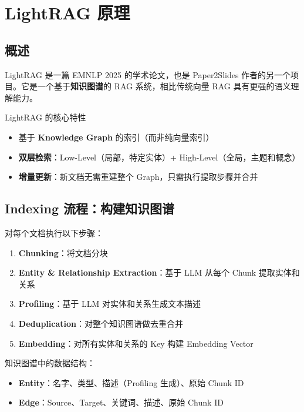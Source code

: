 \section{LightRAG 原理}

\subsection{概述}

LightRAG 是一篇 EMNLP 2025 的学术论文，也是 Paper2Slides 作者的另一个项目。它是一个基于\textbf{知识图谱}的 RAG 系统，相比传统向量 RAG 具有更强的语义理解能力。

\begin{importantbox}{LightRAG 的核心特性}
\begin{itemize}
    \item 基于 \textbf{Knowledge Graph} 的索引（而非纯向量索引）
    \item \textbf{双层检索}：Low-Level（局部，特定实体）+ High-Level（全局，主题和概念）
    \item \textbf{增量更新}：新文档无需重建整个 Graph，只需执行提取步骤并合并
\end{itemize}
\end{importantbox}

\subsection{Indexing 流程：构建知识图谱}

对每个文档执行以下步骤：

\begin{enumerate}
    \item \textbf{Chunking}：将文档分块
    \item \textbf{Entity \& Relationship Extraction}：基于 LLM 从每个 Chunk 提取实体和关系
    \item \textbf{Profiling}：基于 LLM 对实体和关系生成文本描述
    \item \textbf{Deduplication}：对整个知识图谱做去重合并
    \item \textbf{Embedding}：对所有实体和关系的 Key 构建 Embedding Vector
\end{enumerate}

知识图谱中的数据结构：
\begin{itemize}
    \item \textbf{Entity}：名字、类型、描述（Profiling 生成）、原始 Chunk ID
    \item \textbf{Edge}：Source、Target、关键词、描述、原始 Chunk ID
\end{itemize}

